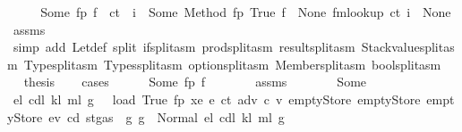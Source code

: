 \begin{isabellebody}
\ \ \isamarkupfalse%
\ \isamarkupfalse%
\ {\isacharparenleft}{\kern0pt}Some{\isacharparenright}{\kern0pt}\ fp\ f\ \ {\isachardoublequoteopen}ct\ {\isachardollar}{\kern0pt}{\isachardollar}{\kern0pt}\ i\ {\isacharequal}{\kern0pt}\ Some\ {\isacharparenleft}{\kern0pt}Method\ {\isacharparenleft}{\kern0pt}fp{\isacharcomma}{\kern0pt}\ True{\isacharcomma}{\kern0pt}\ f{\isacharparenright}{\kern0pt}{\isacharparenright}{\kern0pt}{\isachardoublequoteclose}\ {\isacharbar}{\kern0pt}\ {\isacharparenleft}{\kern0pt}None{\isacharparenright}{\kern0pt}\ {\isachardoublequoteopen}fmlookup\ ct\ i\ {\isacharequal}{\kern0pt}\ None{\isachardoublequoteclose}\ \isamarkupfalse%
\ assms\ \isamarkupfalse%
\ {\isacharparenleft}{\kern0pt}simp\ add{\isacharcolon}{\kern0pt}\ Let{\isacharunderscore}{\kern0pt}def\ split{\isacharcolon}{\kern0pt}\ if{\isacharunderscore}{\kern0pt}split{\isacharunderscore}{\kern0pt}asm\ prod{\isachardot}{\kern0pt}split{\isacharunderscore}{\kern0pt}asm\ result{\isachardot}{\kern0pt}split{\isacharunderscore}{\kern0pt}asm\ Stackvalue{\isachardot}{\kern0pt}split{\isacharunderscore}{\kern0pt}asm\ Type{\isachardot}{\kern0pt}split{\isacharunderscore}{\kern0pt}asm\ Types{\isachardot}{\kern0pt}split{\isacharunderscore}{\kern0pt}asm\ option{\isachardot}{\kern0pt}split{\isacharunderscore}{\kern0pt}asm\ Member{\isachardot}{\kern0pt}split{\isacharunderscore}{\kern0pt}asm\ bool{\isachardot}{\kern0pt}split{\isacharunderscore}{\kern0pt}asm{\isacharparenright}{\kern0pt}\isanewline
\ \ \isamarkupfalse%
\ \isamarkupfalse%
\ {\isacharquery}{\kern0pt}thesis\isanewline
\ \ \isamarkupfalse%
\ cases\isanewline
\ \ \ \ \isamarkupfalse%
\ {\isacharparenleft}{\kern0pt}Some\ fp\ f{\isacharparenright}{\kern0pt}\isanewline
\ \ \ \ \isamarkupfalse%
\ \isamarkupfalse%
\ assms\ {}\ {}\ {}\ {}\ {}\ {}\ {}\ Some\ \isamarkupfalse%
\ e\isactrlsub l\ cd\isactrlsub l\ k\isactrlsub l\ m\isactrlsub l\ g{\isacharprime}{\kern0pt}{\isacharprime}{\kern0pt}\ \ {}{\isacharcolon}{\kern0pt}\ {\isachardoublequoteopen}load\ True\ fp\ xe\ {\isacharparenleft}{\kern0pt}e{\isacharprime}{\kern0pt}\ ct\ adv\ c\ v{\isacharprime}{\kern0pt}{\isacharparenright}{\kern0pt}\ emptyStore\ emptyStore\ emptyStore\ ev\ cd\ {\isacharparenleft}{\kern0pt}st{\isasymlparr}gas\ {\isacharcolon}{\kern0pt}{\isacharequal}{\kern0pt}\ g{\isacharprime}{\kern0pt}{\isasymrparr}{\isacharparenright}{\kern0pt}\ g{\isacharprime}{\kern0pt}\ {\isacharequal}{\kern0pt}\ Normal\ {\isacharparenleft}{\kern0pt}{\isacharparenleft}{\kern0pt}e\isactrlsub l{\isacharcomma}{\kern0pt}\ cd\isactrlsub l{\isacharcomma}{\kern0pt}\ k\isactrlsub l{\isacharcomma}{\kern0pt}\ m\isactrlsub l{\isacharparenright}{\kern0pt}{\isacharcomma}{\kern0pt}\ g{\isacharprime}{\kern0pt}{\isacharprime}{\kern0pt}{\isacharparenright}{\kern0pt}{\isachardoublequoteclose}\ \isamarkupfalse%

\end{isabellebody}

